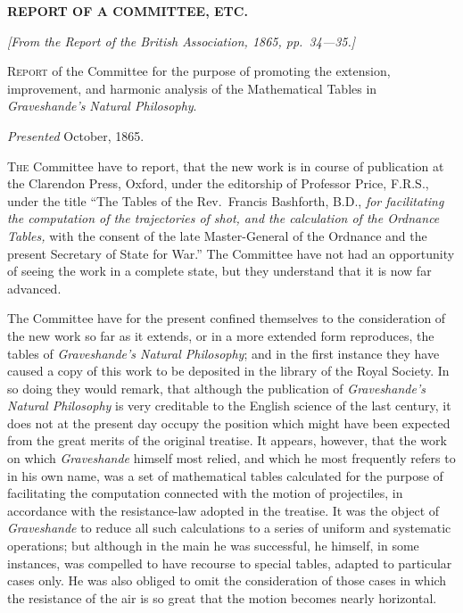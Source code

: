 \documentclass[11pt,a4paper]{article}
\begin{document}
\begin{center}
\textbf{REPORT OF A COMMITTEE, ETC.}
\end{center}

\begin{flushright}
\small\textit{[From the Report of the British Association, 1865, pp.~34---35.]}
\end{flushright}

\vspace{6pt}

\noindent
\textsc{Report} of the Committee for the purpose of promoting the extension, improvement, and harmonic analysis of the Mathematical Tables in \textit{Graveshande's} 
\textit{Natural Philosophy}.

\begin{flushright}
\textit{Presented} October, 1865.
\end{flushright}

\vspace{12pt}

\noindent
\textsc{The} Committee have to report, that the new work is in course of publication at the Clarendon Press, Oxford, under the editorship of Professor Price, F.R.S., under the title ``The Tables of the Rev.\ Francis Bashforth, B.D., \textit{for facilitating the computation of the trajectories of shot, and the calculation of the Ordnance Tables,} with the consent of the late Master-General of the Ordnance and the present Secretary of State for War.'' The Committee have not had an opportunity of seeing the work in a complete state, but they understand that it is now far advanced.

The Committee have for the present confined themselves to the consideration of the new work so far as it extends, or in a more extended form reproduces, the tables of \textit{Graveshande's Natural Philosophy}; and in the first instance they have caused a copy of this work to be deposited in the library of the Royal Society. In so doing they would remark, that although the publication of \textit{Graveshande's Natural Philosophy} is very creditable to the English science of the last century, it does not at the present day occupy the position which might have been expected from the great merits of the original treatise. It appears, however, that the work on which \textit{Graveshande} himself most relied, and which he most frequently refers to in his own name, was a set of mathematical tables calculated for the purpose of facilitating the computation connected with the motion of projectiles, in accordance with the resistance-law adopted in the treatise. It was the object of \textit{Graveshande} to reduce all such calculations to a series of uniform and systematic operations; but although in the main he was successful, he himself, in some instances, was compelled to have recourse to special tables, adapted to particular cases only. He was also obliged to omit the consideration of those cases in which the resistance of the air is so great that the motion becomes nearly horizontal.
\end{document}
